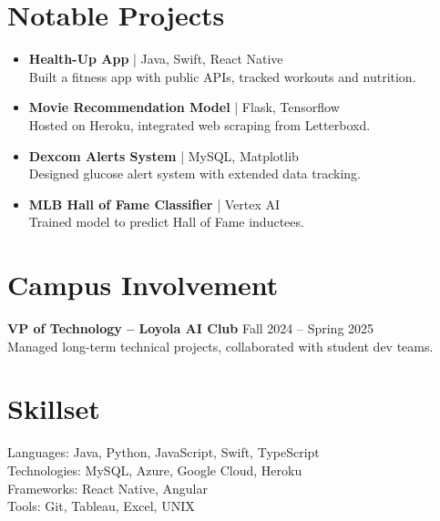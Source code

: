 \documentclass[10pt]{article}
\begin{document}
\section*{Notable Projects}
\begin{itemize}[leftmargin=*]
    \item \textbf{Health-Up App} | Java, Swift, React Native \\
    Built a fitness app with public APIs, tracked workouts and nutrition.
    \item \textbf{Movie Recommendation Model} | Flask, Tensorflow \\
    Hosted on Heroku, integrated web scraping from Letterboxd.
    \item \textbf{Dexcom Alerts System} | MySQL, Matplotlib \\
    Designed glucose alert system with extended data tracking.
    \item \textbf{MLB Hall of Fame Classifier} | Vertex AI \\
    Trained model to predict Hall of Fame inductees.
\end{itemize}

\vspace{10pt}
\section*{Campus Involvement}
\textbf{VP of Technology – Loyola AI Club} \hfill Fall 2024 – Spring 2025 \\
Managed long-term technical projects, collaborated with student dev teams.

\vspace{10pt}
\section*{Skillset}
Languages: Java, Python, JavaScript, Swift, TypeScript \\
Technologies: MySQL, Azure, Google Cloud, Heroku \\
Frameworks: React Native, Angular \\
Tools: Git, Tableau, Excel, UNIX
\end{document}
